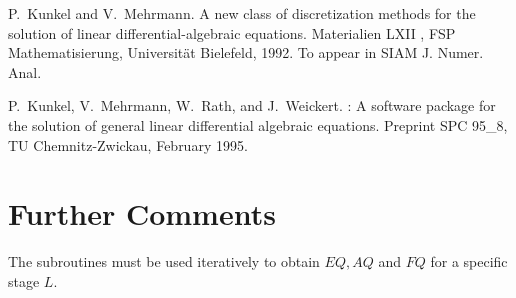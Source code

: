 \begin{thebibliography}{1}

P.~Kunkel and V.~Mehrmann.
\newblock A new class of discretization methods for the solution of linear
  differential-algebraic equations.
\newblock Materialien LXII , FSP Mathematisierung, Universit{\"a}t Bielefeld,
  1992.
\newblock To appear in SIAM J. Numer. Anal.

P.~Kunkel, V.~Mehrmann, W.~Rath, and J.~Weickert.
: A software package for the solution of general linear
  differential algebraic equations.
\newblock Preprint SPC 95_8, TU Chemnitz-Zwickau, February 1995.

\end{thebibliography}


\section{Further Comments}
The subroutines must be used iteratively to obtain $EQ, AQ$ and $FQ$
for a specific stage $L$.


